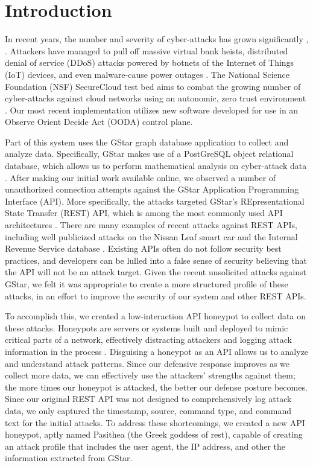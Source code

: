 
\section{Introduction} \label{intro}

In recent years, the number and severity of cyber-attacks has grown significantly \cite{Symantec-Threat-Report, IBM-XForce-Report}, \cite{IBM-XForce-Report}. Attackers have managed to pull off massive virtual bank heists, distributed denial of service (DDoS) attacks powered by botnets of the Internet of Things (IoT) devices, and even malware-cause power outages \cite{IBM-XForce-Report}. The National Science Foundation (NSF) SecureCloud test bed aims to combat the growing number of cyber-attacks against cloud networks using an autonomic, zero trust environment \cite{7796146}.  Our most recent implementation utilizes new software developed for use in an Observe Orient Decide Act (OODA) control plane.

Part of this system uses the GStar graph database application to collect and analyze data. Specifically, GStar makes use of a PostGreSQL object relational database, which allows us to perform mathematical analysis on cyber-attack data \cite{GStar}.  After making our initial work available online, we observed a number of unauthorized connection attempts against the GStar Application Programming Interface (API).  More specifically, the attacks targeted GStar's REpresentational State Transfer (REST) API, which is among the most commonly used API architectures \cite{REST-API-use}. There are many examples of recent attacks against REST APIs, including well publicized attacks on the Nissan Leaf smart car \cite{Nissan-Leaf} and the Internal Revenue Service database \cite{IRS}.  Existing APIs often do not follow security best practices, and developers can be lulled into a false sense of security believing that the API will not be an attack target.  Given the recent unsolicited attacks against GStar, we felt it was appropriate to create a more structured profile of these attacks, in an effort to improve the security of our system and other REST APIs.

To accomplish this, we created a low-interaction API honeypot to collect data on these attacks.  Honeypots are servers or systems built and deployed to mimic critical parts of a network, effectively distracting attackers and logging attack information in the process \cite{honeypot-Def}. Disguising a honeypot as an API allows us to analyze and understand attack patterns.  Since our defensive response improves as we collect more data, we can effectively use the attackers' strengths against them; the more times our honeypot is attacked, the better our defense posture becomes.  Since our original REST API was not designed to comprehensively log attack data, we only captured the timestamp, source, command type, and command text for the initial attacks.  To address these shortcomings, we created a new API honeypot, aptly named Pasithea (the Greek goddess of rest), capable of creating an attack profile that includes the user agent, the IP address, and other the information extracted from GStar.

